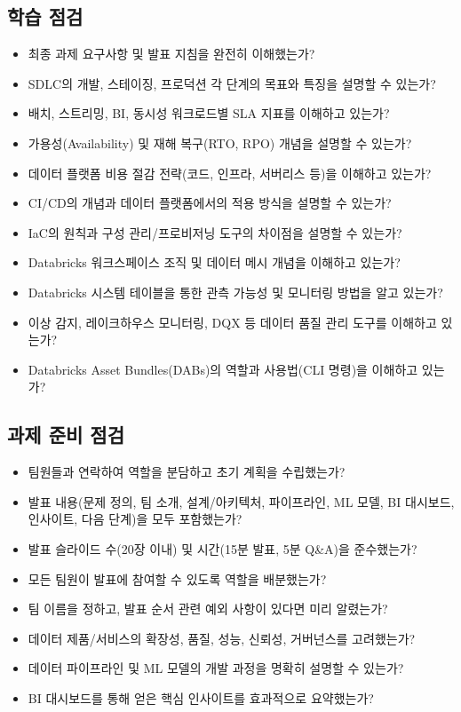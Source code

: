 \documentclass[11pt,a4paper]{article}
\begin{document}
\subsection*{학습 점검}
\begin{itemize}
    \item [ ] 최종 과제 요구사항 및 발표 지침을 완전히 이해했는가?
    \item [ ] SDLC의 개발, 스테이징, 프로덕션 각 단계의 목표와 특징을 설명할 수 있는가?
    \item [ ] 배치, 스트리밍, BI, 동시성 워크로드별 SLA 지표를 이해하고 있는가?
    \item [ ] 가용성(Availability) 및 재해 복구(RTO, RPO) 개념을 설명할 수 있는가?
    \item [ ] 데이터 플랫폼 비용 절감 전략(코드, 인프라, 서버리스 등)을 이해하고 있는가?
    \item [ ] CI/CD의 개념과 데이터 플랫폼에서의 적용 방식을 설명할 수 있는가?
    \item [ ] IaC의 원칙과 구성 관리/프로비저닝 도구의 차이점을 설명할 수 있는가?
    \item [ ] Databricks 워크스페이스 조직 및 데이터 메시 개념을 이해하고 있는가?
    \item [ ] Databricks 시스템 테이블을 통한 관측 가능성 및 모니터링 방법을 알고 있는가?
    \item [ ] 이상 감지, 레이크하우스 모니터링, DQX 등 데이터 품질 관리 도구를 이해하고 있는가?
    \item [ ] Databricks Asset Bundles(DABs)의 역할과 사용법(CLI 명령)을 이해하고 있는가?
\end{itemize}

\subsection*{과제 준비 점검}
\begin{itemize}
    \item [ ] 팀원들과 연락하여 역할을 분담하고 초기 계획을 수립했는가?
    \item [ ] 발표 내용(문제 정의, 팀 소개, 설계/아키텍처, 파이프라인, ML 모델, BI 대시보드, 인사이트, 다음 단계)을 모두 포함했는가?
    \item [ ] 발표 슬라이드 수(20장 이내) 및 시간(15분 발표, 5분 Q\&A)을 준수했는가?
    \item [ ] 모든 팀원이 발표에 참여할 수 있도록 역할을 배분했는가?
    \item [ ] 팀 이름을 정하고, 발표 순서 관련 예외 사항이 있다면 미리 알렸는가?
    \item [ ] 데이터 제품/서비스의 확장성, 품질, 성능, 신뢰성, 거버넌스를 고려했는가?
    \item [ ] 데이터 파이프라인 및 ML 모델의 개발 과정을 명확히 설명할 수 있는가?
    \item [ ] BI 대시보드를 통해 얻은 핵심 인사이트를 효과적으로 요약했는가?
\end{itemize}
\end{document}
